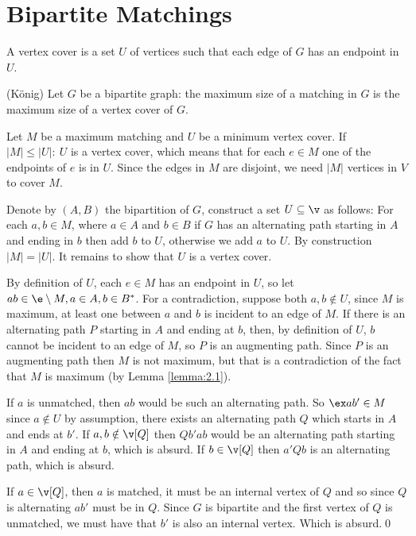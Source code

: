 \section{Bipartite Matchings}
\begin{definition}
    A vertex cover is a set $U$ of vertices such that each edge of $G$ has an endpoint in $U$.
\end{definition}
\begin{customtheorem}{(König)}
\label{theorem:konig}
    Let $G$ be a bipartite graph: the maximum size of a matching in $G$ is the maximum size of a vertex cover of $G$.
\end{customtheorem}
\begin{prf}
    Let $M$ be a maximum matching and $U$ be a minimum vertex cover. If $|M| \leq |U|:\:U$ is a vertex cover, which means that for each $e \in M$ one of the endpoints of $e$ is in $U$. Since the edges in $M$ are disjoint, we need $|M|$ vertices in $V$ to cover $M$.

    Denote by $(A, B)$ the bipartition of $G$, construct a set $U \subseteq \v$ as follows: For each $a, b \in M$, where $a \in A$ and $b \in B$ if $G$ has an alternating path starting in $A$ and ending in $b$ then add $b$ to $U$, otherwise we add $a$ to $U$. By construction $|M| = |U|$. It remains to show that $U$ is a vertex cover.

    By definition of $U$, each $e \in M$ has an endpoint in $U$, so let $ab \in \e \setminus M, a \in A, b \in B^*$. For a contradiction, suppose both $a, b \notin U$, since $M$ is maximum, at least one between $a$ and $b$ is incident to an edge of $M$. If there is an alternating path $P$ starting in $A$ and ending at $b$, then, by definition of $U$, $b$ cannot be incident to an edge of $M$, so $P$ is an augmenting path. Since $P$ is an augmenting path then $M$ is not maximum, but that is a contradiction of the fact that $M$ is maximum (by Lemma \ref{lemma:2.1}).

    If $a$ is unmatched, then $ab$ would be such an alternating path. So $\ex ab' \in M$ since $a \notin U$ by assumption, there exists an alternating path $Q$ which starts in $A$ and ends at $b'$. If $a, b \notin \v[Q]$ then $Qb'ab$ would be an alternating path starting in $A$ and ending at $b$, which is absurd. If $b \in \v[Q]$ then $a'Qb$ is an alternating path, which is absurd.

    If $a \in \v[Q]$, then $a$ is matched, it must be an internal vertex of $Q$ and so since $Q$ is alternating $ab'$ must be in $Q$. Since $G$ is bipartite and the first vertex of $Q$ is unmatched, we must have that $b'$ is also an internal vertex. Which is absurd.\qed
\end{prf}
